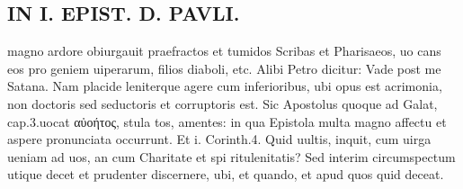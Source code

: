 \documentclass{article}
\begin{document}
\begin{pages}
\section*{IN I. EPIST. D. PAVLI. }
\marginpar{[ p.105 ]}\pstart magno ardore obiurgauit praefractos et tumidos Scribas et Pharisaeos, uo cans eos pro geniem uiperarum, filios diaboli, etc. Alibi Petro dicitur: Vade post me Satana. Nam placide leniterque agere cum inferioribus, ubi opus est acrimonia, non doctoris sed seductoris et corruptoris est. Sic Apostolus quoque ad Galat, cap.3.uocat αὐοήτος, stula tos, amentes: in qua Epistola multa magno affectu et aspere pronunciata occurrunt. Et i. Corinth.4. Quid uultis, inquit, cum uirga ueniam ad uos, an cum Charitate et spi ritulenitatis? Sed interim circumspectum utique decet et prudenter discernere, ubi, et quando, et apud quos quid deceat.  \pend
{}
{}

\end{pages}
\end{document}
